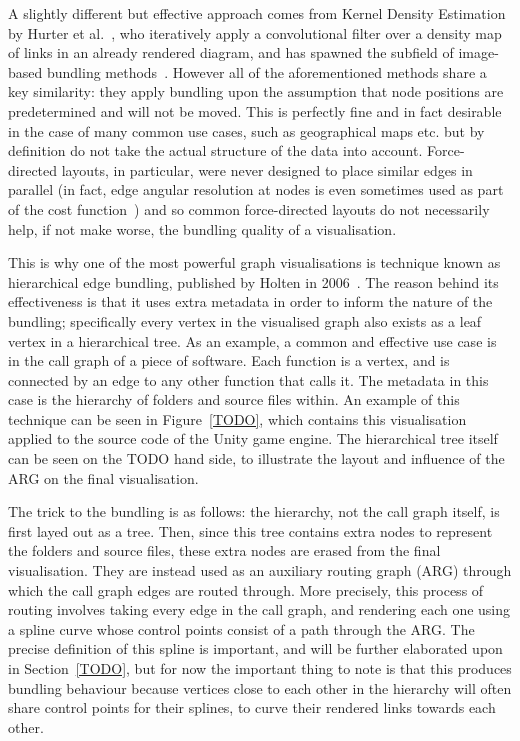 A slightly different but effective approach comes from Kernel Density Estimation by Hurter et al.~\cite{TODO}, who iteratively apply a convolutional filter over a density map of links in an already rendered diagram, and has spawned the subfield of image-based bundling methods~\cite{TODO,TODO,TODO}.
However all of the aforementioned methods share a key similarity: they apply bundling upon the assumption that node positions are predetermined and will not be moved. This is perfectly fine and in fact desirable in the case of many common use cases, such as geographical maps etc. but by definition do not take the actual structure of the data into account. Force-directed layouts, in particular, were never designed to place similar edges in parallel (in fact, edge angular resolution at nodes is even sometimes used as part of the cost function~\cite{TODO}) and so common force-directed layouts do not necessarily help, if not make worse, the bundling quality of a visualisation.

This is why one of the most powerful graph visualisations is technique known as hierarchical edge bundling, published by Holten in 2006~\cite{TODO}. The reason behind its effectiveness is that it uses extra metadata in order to inform the nature of the bundling; specifically every vertex in the visualised graph also exists as a leaf vertex in a hierarchical tree. As an example, a common and effective use case is in the call graph of a piece of software. Each function is a vertex, and is connected by an edge to any other function that calls it. The metadata in this case is the hierarchy of folders and source files within.
An example of this technique can be seen in Figure~\ref{TODO}, which contains this visualisation applied to the source code of the Unity game engine. The hierarchical tree itself can be seen on the TODO hand side, to illustrate the layout and influence of the ARG on the final visualisation. 

The trick to the bundling is as follows: the hierarchy, not the call graph itself, is first layed out as a tree. Then, since this tree contains extra nodes to represent the folders and source files, these extra nodes are erased from the final visualisation. They are instead used as an auxiliary routing graph (ARG) through which the call graph edges are routed through.
More precisely, this process of routing involves taking every edge in the call graph, and rendering each one using a spline curve whose control points consist of a path through the ARG. The precise definition of this spline is important, and will be further elaborated upon in Section~\ref{TODO}, but for now the important thing to note is that this produces bundling behaviour because vertices close to each other in the hierarchy will often share control points for their splines, to curve their rendered links towards each other.

